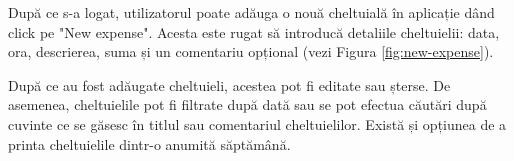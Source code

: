 După ce s-a logat, utilizatorul poate adăuga o nouă cheltuială în aplicație
dând click pe "New expense". Acesta este rugat să introducă detaliile
cheltuielii: data, ora, descrierea, suma și un comentariu opțional
(vezi Figura \ref{fig:new-expense}).

După ce au fost adăugate cheltuieli, acestea pot fi editate sau șterse.
De asemenea, cheltuielile pot fi filtrate după dată sau se pot
efectua căutări după cuvinte ce se găsesc în titlul sau comentariul
cheltuielilor. Există și opțiunea de a printa cheltuielile dintr-o
anumită săptămână.


